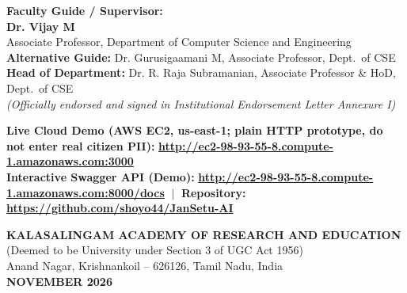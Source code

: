 \documentclass[12pt,a4paper,oneside]{report}
\begin{document}
\begin{titlepage}
    \vspace{0.4cm}
    \begin{center} \normalsize
        \textbf{Faculty Guide / Supervisor:}\\[0.08cm]
        \textbf{\large Dr. Vijay M}\\[0.06cm]
        Associate Professor, Department of Computer Science and Engineering\\[0.2cm]
        \textbf{Alternative Guide:}\; Dr. Gurusigaamani M, Associate Professor, Dept.\ of CSE\\[0.1cm]
        \textbf{Head of Department:}\; Dr. R. Raja Subramanian, Associate Professor \& HoD, Dept.\ of CSE\\[0.08cm]
        \footnotesize \textit{(Officially endorsed and signed in Institutional Endorsement Letter Annexure I)}
    \end{center}
    
    \vspace{0.7cm}
    \begin{tcolorbox}[colback=monolightgray,colframe=monoblack,arc=1mm,boxrule=0.8pt,center,width=0.98\textwidth]
        \centering \small
        \textbf{Live Cloud Demo (AWS EC2, us-east-1; plain HTTP prototype, do not enter real citizen PII):} \href{http://ec2-98-93-55-8.compute-1.amazonaws.com:3000}{\textbf{\color{linkblue}http://ec2-98-93-55-8.compute-1.amazonaws.com:3000}} \\[0.12cm]
        \textbf{Interactive Swagger API (Demo):} \href{http://ec2-98-93-55-8.compute-1.amazonaws.com:8000/docs}{\textbf{\color{linkblue}http://ec2-98-93-55-8.compute-1.amazonaws.com:8000/docs}} $\;\vert\;$ \textbf{Repository:} \href{https://github.com/shoyo44/JanSetu-AI}{\textbf{\color{linkblue}https://github.com/shoyo44/JanSetu-AI}}
    \end{tcolorbox}
    
    \vfill
    
    \begin{center}
        \textbf{\large KALASALINGAM ACADEMY OF RESEARCH AND EDUCATION}\\[0.15cm]
        {\normalsize (Deemed to be University under Section 3 of UGC Act 1956)}\\[0.1cm]
        {\normalsize Anand Nagar, Krishnankoil -- 626126, Tamil Nadu, India}\\[0.5cm]
        \textbf{NOVEMBER 2026}
    \end{center}
\end{titlepage}

\setcounter{page}{1}
\end{document}
